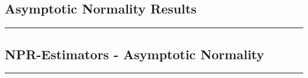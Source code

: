 \subsection{Asymptotic Normality Results}
\hrule


\subsection{NPR-Estimators - Asymptotic Normality}
\hrule

